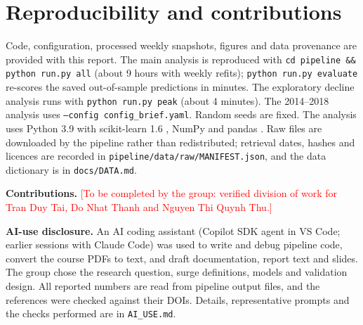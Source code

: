 \section{Reproducibility and contributions}
\label{sec:reproducibility}
Code, configuration, processed weekly snapshots, figures and data provenance are provided with
this report. The main analysis is reproduced with \texttt{cd pipeline \&\& python run.py all}
(about 9 hours with weekly refits); \texttt{python run.py evaluate} re-scores the saved
out-of-sample predictions in minutes. The exploratory decline analysis runs with \texttt{python run.py peak} (about 4 minutes).
The 2014--2018 analysis uses
\texttt{--config config\_brief.yaml}. Random seeds are fixed. The analysis uses Python 3.9 with scikit-learn 1.6 \citep{pedregosa2011scikit}, NumPy and pandas \citep{harris2020numpy,mckinney2010pandas}. Raw files are downloaded by the
pipeline rather than redistributed; retrieval dates, hashes and licences are recorded in
\texttt{pipeline/data/raw/MANIFEST.json}, and the data dictionary is in \texttt{docs/DATA.md}.

\textbf{Contributions.} \textcolor{red}{[To be completed by the group: verified division of work
for Tran Duy Tai, Do Nhat Thanh and Nguyen Thi Quynh Thu.]}

\textbf{AI-use disclosure.} An AI coding assistant (Copilot SDK agent in VS Code; earlier
sessions with Claude Code) was used to write and debug pipeline code, convert the course PDFs to
text, and draft documentation, report text and slides. The group chose the research question,
surge definitions, models and validation design. All reported numbers are read from pipeline
output files, and the references were checked against their DOIs. Details, representative
prompts and the checks performed are in \texttt{AI\_USE.md}.
